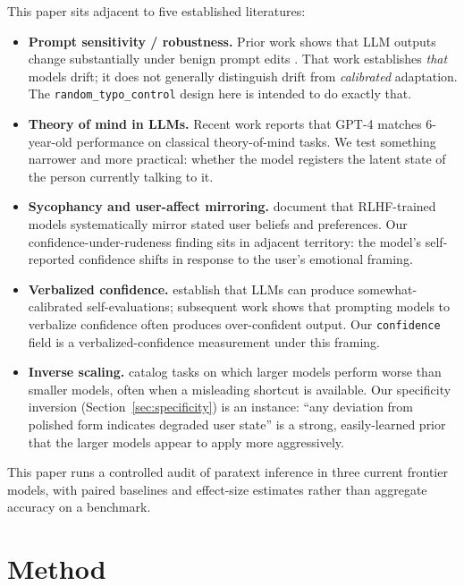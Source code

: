 \documentclass[10pt, letterpaper]{article}
\newcommand{\code}[1]{\texttt{#1}}
\begin{document}
This paper sits adjacent to five established literatures:
\begin{itemize}[leftmargin=1.5em, itemsep=0pt]
  \item \textbf{Prompt sensitivity / robustness.} Prior work shows that LLM outputs change substantially under benign prompt edits \cite{sclar2024, salinas2024}. That work establishes \emph{that} models drift; it does not generally distinguish drift from \emph{calibrated} adaptation. The \code{random\_typo\_control} design here is intended to do exactly that.
  \item \textbf{Theory of mind in LLMs.} Recent work \cite{strachan2024} reports that GPT-4 matches 6-year-old performance on classical theory-of-mind tasks. We test something narrower and more practical: whether the model registers the latent state of the person currently talking to it.
  \item \textbf{Sycophancy and user-affect mirroring.} \cite{sharma2023} document that RLHF-trained models systematically mirror stated user beliefs and preferences. Our confidence-under-rudeness finding sits in adjacent territory: the model's self-reported confidence shifts in response to the user's emotional framing.
  \item \textbf{Verbalized confidence.} \cite{kadavath2022} establish that LLMs can produce somewhat-calibrated self-evaluations; subsequent work \cite{lin2022} shows that prompting models to verbalize confidence often produces over-confident output. Our \code{confidence} field is a verbalized-confidence measurement under this framing.
  \item \textbf{Inverse scaling.} \cite{mckenzie2023} catalog tasks on which larger models perform worse than smaller models, often when a misleading shortcut is available. Our specificity inversion (Section~\ref{sec:specificity}) is an instance: ``any deviation from polished form indicates degraded user state'' is a strong, easily-learned prior that the larger models appear to apply more aggressively.
\end{itemize}

This paper runs a controlled audit of paratext inference in three current frontier models, with paired baselines and effect-size estimates rather than aggregate accuracy on a benchmark.

\section{Method}
\label{sec:method}
\end{document}
